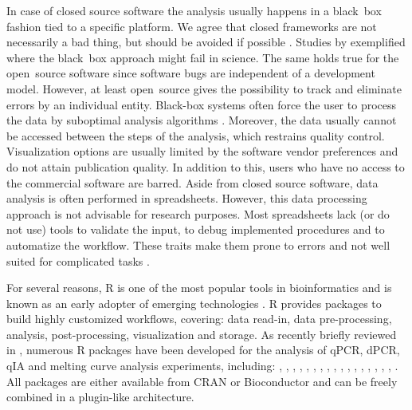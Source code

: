 In case of closed source software the analysis usually happens in a black~box 
fashion tied to a specific platform. We agree that closed frameworks are not 
necessarily a bad thing, but should be avoided if possible 
\citep{roediger_RJ_2013, Spiess_2014}. Studies by \citet{mccullough_2008, 
Almiron_2010, Duran_2014} exemplified where the black~box approach might fail in 
science. The same holds true for the open~source software since software bugs 
are independent of a development model. However, at least open~source gives the 
possibility to track and eliminate errors by an individual entity. Black-box 
systems often force the user to process the data by suboptimal analysis 
algorithms \citep{ruijter_2013}. Moreover, the data usually cannot be accessed 
between the steps of the analysis, which restrains quality control. Visualization 
options are usually limited by the software vendor preferences and do not attain 
publication quality. In addition to this, users who have no access to the 
commercial software are barred. Aside from closed source software, data analysis 
is often performed in spreadsheets. However, this data processing approach is 
not advisable for research purposes. Most spreadsheets  lack (or do not use) 
tools to validate the input, to debug implemented procedures and to automatize 
the workflow. These traits make them prone to errors and not well suited for 
complicated tasks \citep{mccullough_2008, burns_2014}.

For several reasons, R is one of the most popular tools in bioinformatics and is 
known as an early adopter of emerging technologies \citep{pabinger_2014}. R 
provides packages to build highly customized workflows, covering: data read-in, 
data pre-processing, analysis, post-processing, visualization and storage. As 
recently briefly reviewed in \citet{pabinger_2014}, numerous R packages have 
been developed for the analysis of qPCR, dPCR, qIA and melting curve analysis 
experiments, including: , , 
, , , , 
, , , , 
, , , , 
, , , 
. All packages are either available from CRAN or 
Bioconductor \citep{gentleman_2004} and can be freely combined in a 
plugin-like architecture.

